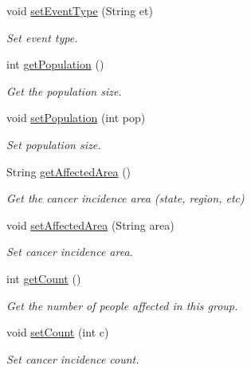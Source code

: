 \begin{DoxyCompactItemize}
void \mbox{\hyperlink{classbridges_1_1data__src__dependent_1_1_cancer_incidence_a39338b20223e60b79fa38b3034ca46b7}{set\+Event\+Type}} (String et)
\begin{DoxyCompactList}\small\item\em Set event type. \end{DoxyCompactList}\item 
int \mbox{\hyperlink{classbridges_1_1data__src__dependent_1_1_cancer_incidence_a41c2507d46589080f6bb76ab29f53665}{get\+Population}} ()
\begin{DoxyCompactList}\small\item\em Get the population size. \end{DoxyCompactList}\item 
void \mbox{\hyperlink{classbridges_1_1data__src__dependent_1_1_cancer_incidence_a9f1caf002b6573aa699a81ed1b835af0}{set\+Population}} (int pop)
\begin{DoxyCompactList}\small\item\em Set population size. \end{DoxyCompactList}\item 
String \mbox{\hyperlink{classbridges_1_1data__src__dependent_1_1_cancer_incidence_ad4c0c709fa5da9c0f20b648052db5f26}{get\+Affected\+Area}} ()
\begin{DoxyCompactList}\small\item\em Get the cancer incidence area (state, region, etc) \end{DoxyCompactList}\item 
void \mbox{\hyperlink{classbridges_1_1data__src__dependent_1_1_cancer_incidence_a9c7f2d303da9498e5e6145439c5a6fbc}{set\+Affected\+Area}} (String area)
\begin{DoxyCompactList}\small\item\em Set cancer incidence area. \end{DoxyCompactList}\item 
int \mbox{\hyperlink{classbridges_1_1data__src__dependent_1_1_cancer_incidence_a8769cb18ddb590dc41a04a220174f3df}{get\+Count}} ()
\begin{DoxyCompactList}\small\item\em Get the number of people affected in this group. \end{DoxyCompactList}\item 
void \mbox{\hyperlink{classbridges_1_1data__src__dependent_1_1_cancer_incidence_a18099439ef6e35cf240b06f0e0158c72}{set\+Count}} (int c)
\begin{DoxyCompactList}\small\item\em Set cancer incidence count. \end{DoxyCompactList}\item 

\end{DoxyCompactItemize}
